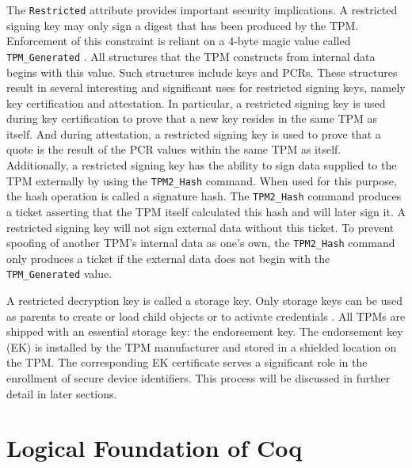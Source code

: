 The \verb|Restricted| attribute provides important security implications. A restricted signing key may only sign a digest that has been produced by the TPM. Enforcement of this constraint is reliant on a 4-byte magic value called \verb|TPM_Generated| \cite{TPMSpec}. All structures that the TPM constructs from internal data begins with this value. Such structures include keys and PCRs. These structures result in several interesting and significant uses for restricted signing keys, namely key certification and attestation. In particular, a restricted signing key is used during key certification to prove that a new key resides in the same TPM as itself. And during attestation, a restricted signing key is used to prove that a quote is the result of the PCR values within the same TPM as itself. Additionally, a restricted signing key has the ability to sign data supplied to the TPM externally by using the \verb|TPM2_Hash| command. When used for this purpose, the hash operation is called a signature hash. The \verb|TPM2_Hash| command produces a ticket asserting that the TPM itself calculated this hash and will later sign it. A restricted signing key will not sign external data without this ticket. To prevent spoofing of another TPM's internal data as one's own, the \verb|TPM2_Hash| command only produces a ticket if the external data does not begin with the \verb|TPM_Generated| value.


A restricted decryption key is called a storage key. Only storage keys can be used as parents to create or load child objects or to activate credentials \cite{PracticalGuide}. All TPMs are shipped with an essential storage key: the endorsement key. The endorsement key (EK) is installed by the TPM manufacturer and stored in a shielded location on the TPM. The corresponding EK certificate serves a significant role in the enrollment of secure device identifiers. 
This process will be discussed in further detail in later sections.








\section{Logical Foundation of Coq}



